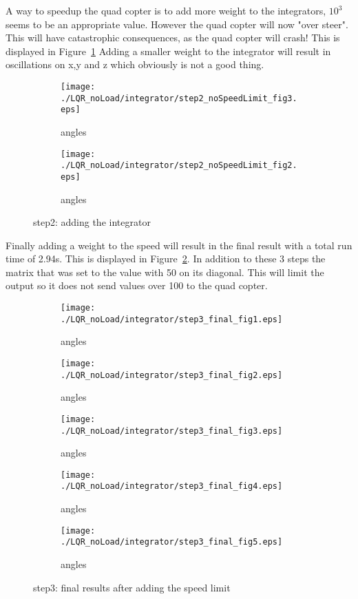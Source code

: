 A way to speedup the quad copter is to add more weight to the integrators, $10^3$ seems to be an appropriate value. However the quad copter will now "over steer". This will have catastrophic consequences, as the quad copter will  crash! This is displayed in Figure~\ref{fig:step2 integrator} Adding a smaller weight to the integrator will result in oscillations on x,y and z which obviously is not a good thing.

\begin{figure}[H]
	\centering
	\begin{subfigure}[b]{0.3\textwidth}
		\texttt{[image: ./LQR\_noLoad/integrator/step2\_noSpeedLimit\_fig3.eps]}
		\caption{angles}
	\end{subfigure}
	\begin{subfigure}[b]{0.3\textwidth}
		\texttt{[image: ./LQR\_noLoad/integrator/step2\_noSpeedLimit\_fig2.eps]}
		\caption{angles}
	\end{subfigure}
	\caption{step2: adding the integrator}\label{fig:step2 integrator}
\end{figure}

Finally adding a weight to the speed will result in the final result with a total run time of 2.94s. This is displayed in Figure~\ref{fig:step3 integrator}. In addition to these 3 steps the matrix that was set to the value with 50 on its diagonal. This will limit the output so it does not send values over 100 to the quad copter.

\begin{figure}[H]
	\centering
	\begin{subfigure}[b]{0.3\textwidth}
		\texttt{[image: ./LQR\_noLoad/integrator/step3\_final\_fig1.eps]}
		\caption{angles}
	\end{subfigure}
	\begin{subfigure}[b]{0.3\textwidth}
		\texttt{[image: ./LQR\_noLoad/integrator/step3\_final\_fig2.eps]}
		\caption{angles}
	\end{subfigure}
	\begin{subfigure}[b]{0.3\textwidth}
		\texttt{[image: ./LQR\_noLoad/integrator/step3\_final\_fig3.eps]}
		\caption{angles}
	\end{subfigure}
	\begin{subfigure}[b]{0.3\textwidth}
		\texttt{[image: ./LQR\_noLoad/integrator/step3\_final\_fig4.eps]}
		\caption{angles}
	\end{subfigure}
	\begin{subfigure}[b]{0.3\textwidth}
		\texttt{[image: ./LQR\_noLoad/integrator/step3\_final\_fig5.eps]}
		\caption{angles}
	\end{subfigure}
	\caption{step3: final results after adding the speed limit}\label{fig:step3 integrator}
\end{figure}

